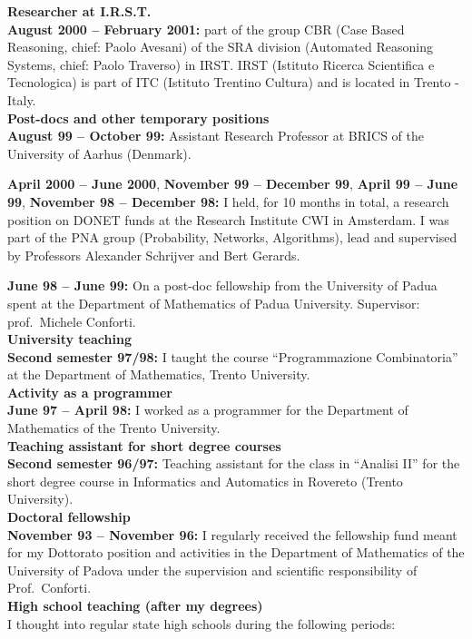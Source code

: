 \documentclass[10pt]{article}
\newcommand{\subvoice}[1] { {\large \bf #1} \smallskip\\ }
\begin{document}
\subvoice{Researcher at I.R.S.T.}
{\bf August 2000 -- February 2001:}
part of the group CBR (Case Based Reasoning, chief: Paolo Avesani)
of the SRA division
(Automated Reasoning Systems, chief: Paolo Traverso) in IRST.
IRST (Istituto Ricerca Scientifica e Tecnologica)
is part of ITC (Istituto Trentino Cultura)
and is located in Trento - Italy.\\


\subvoice{Post-docs and other temporary positions}
{\bf August 99 -- October 99:}
     Assistant Research Professor at BRICS
     of the University of Aarhus (Denmark). 

\noindent
{\bf April 2000 -- June 2000},
{\bf November 99 -- December 99},
{\bf April 99 -- June 99},
{\bf November 98 -- December 98:}
      I held, for 10 months in total,
      a research position on DONET funds
      at the Research Institute CWI in Amsterdam.
      I was part of the PNA group (Probability, Networks, Algorithms),
      lead and supervised by Professors Alexander Schrijver
      and Bert Gerards.

\noindent
{\bf June 98 -- June 99:}
On a post-doc fellowship
from the University of Padua
spent at the Department of Mathematics
of Padua University.
Supervisor: prof.~Michele Conforti.\\

\subvoice{University teaching}
{\bf Second semester 97/98:}
I taught the course ``Programmazione Combinatoria''
at the Department of Mathematics, Trento University.\\

\subvoice{Activity as a programmer}
{\bf June 97 -- April 98:}
I worked as a programmer
for the Department of Mathematics of the Trento University.\\

\subvoice{Teaching assistant for short degree courses}
{\bf Second semester 96/97:}
Teaching assistant for the class in ``Analisi II''
for the short degree course in Informatics and Automatics
in Rovereto (Trento University).\\

\subvoice{Doctoral fellowship}
{\bf November 93 -- November 96:}
I regularly received the fellowship fund
meant for my Dottorato position and activities
in the Department of Mathematics
of the University of Padova 
under the supervision
and scientific responsibility of Prof.~Conforti.\\

\subvoice{High school teaching (after my degrees)}
I thought into regular state high schools
during the following periods:\\
\end{document}
